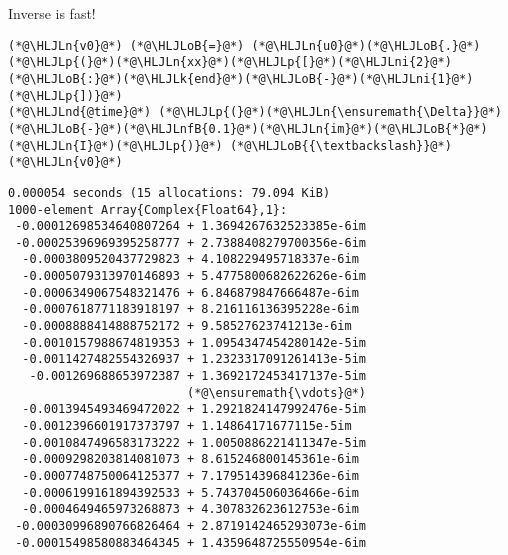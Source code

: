 \documentclass[12pt,a4paper]{article}
\newcommand{\HLJLk}[1]{\textcolor[RGB]{148,91,176}{\textbf{#1}}}
\newcommand{\HLJLn}[1]{#1}
\newcommand{\HLJLnd}[1]{\textcolor[RGB]{214,102,97}{#1}}
\newcommand{\HLJLnfB}[1]{\textcolor[RGB]{59,151,46}{#1}}
\newcommand{\HLJLni}[1]{\textcolor[RGB]{59,151,46}{#1}}
\newcommand{\HLJLoB}[1]{\textcolor[RGB]{102,102,102}{\textbf{#1}}}
\newcommand{\HLJLp}[1]{#1}
\begin{document}
Inverse is fast!


\begin{lstlisting}
(*@\HLJLn{v0}@*) (*@\HLJLoB{=}@*) (*@\HLJLn{u0}@*)(*@\HLJLoB{.}@*)(*@\HLJLp{(}@*)(*@\HLJLn{xx}@*)(*@\HLJLp{[}@*)(*@\HLJLni{2}@*)(*@\HLJLoB{:}@*)(*@\HLJLk{end}@*)(*@\HLJLoB{-}@*)(*@\HLJLni{1}@*)(*@\HLJLp{])}@*)
(*@\HLJLnd{@time}@*) (*@\HLJLp{(}@*)(*@\HLJLn{\ensuremath{\Delta}}@*)(*@\HLJLoB{-}@*)(*@\HLJLnfB{0.1}@*)(*@\HLJLn{im}@*)(*@\HLJLoB{*}@*)(*@\HLJLn{I}@*)(*@\HLJLp{)}@*) (*@\HLJLoB{{\textbackslash}}@*) (*@\HLJLn{v0}@*)
\end{lstlisting}

\begin{lstlisting}
0.000054 seconds (15 allocations: 79.094 KiB)
1000-element Array{Complex{Float64},1}:
 -0.00012698534640807264 + 1.3694267632523385e-6im
 -0.00025396969395258777 + 2.7388408279700356e-6im
  -0.0003809520437729823 + 4.108229495718337e-6im 
  -0.0005079313970146893 + 5.4775800682622626e-6im
  -0.0006349067548321476 + 6.846879847666487e-6im 
  -0.0007618771183918197 + 8.216116136395228e-6im 
  -0.0008888414888752172 + 9.58527623741213e-6im  
  -0.0010157988674819353 + 1.0954347454280142e-5im
  -0.0011427482554326937 + 1.2323317091261413e-5im
   -0.001269688653972387 + 1.3692172453417137e-5im
                         (*@\ensuremath{\vdots}@*)                        
  -0.0013945493469472022 + 1.2921824147992476e-5im
  -0.0012396601917373797 + 1.14864171677115e-5im  
  -0.0010847496583173222 + 1.0050886221411347e-5im
  -0.0009298203814081073 + 8.615246800145361e-6im 
  -0.0007748750064125377 + 7.179514396841236e-6im 
  -0.0006199161894392533 + 5.743704506036466e-6im 
  -0.0004649465973268873 + 4.307832623612753e-6im 
 -0.00030996890766826464 + 2.8719142465293073e-6im
 -0.00015498580883464345 + 1.4359648725550954e-6im
\end{lstlisting}
\end{document}
